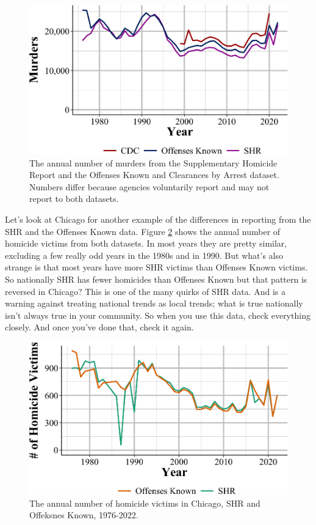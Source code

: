 \documentclass[
  12pt,
  openany]{book}
\begin{document}
\begin{figure}

{\centering \includegraphics[width=0.9\linewidth]{06_shr_files/figure-latex/shrVsOffenses-1} 

}

\caption{The annual number of murders from the Supplementary Homicide Report and the Offenses Known and Clearances by Arrest dataset. Numbers differ because agencies voluntarily report and may not report to both datasets.}\label{fig:shrVsOffenses}
\end{figure}

Let's look at Chicago for another example of the differences in reporting from the SHR and the Offenses Known data. Figure \ref{fig:chicagoSHRvsOffensesKnown} shows the annual number of homicide victims from both datasets. In most years they are pretty similar, excluding a few really odd years in the 1980s and in 1990. But what's also strange is that most years have more SHR victims than Offenses Known victims. So nationally SHR has fewer homicides than Offenses Known but that pattern is reversed in Chicago? This is one of the many quirks of SHR data. And is a warning against treating national trends as local trends; what is true nationally isn't always true in your community. So when you use this data, check everything closely. And once you've done that, check it again.

\begin{figure}

{\centering \includegraphics[width=0.9\linewidth]{06_shr_files/figure-latex/chicagoSHRvsOffensesKnown-1} 

}

\caption{The annual number of homicide victims in Chicago, SHR and Offeksnes Known, 1976-2022.}\label{fig:chicagoSHRvsOffensesKnown}
\end{figure}
\end{document}
